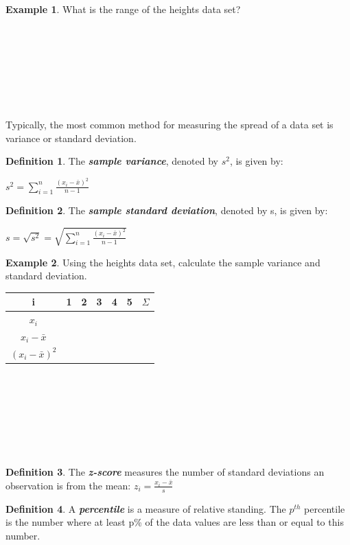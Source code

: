 \documentclass[
  11pt,
  oneside]{book}
\theoremstyle{definition}
\newtheorem{definition}{Definition}[chapter]
\theoremstyle{definition}
\newtheorem{example}{Example}[chapter]
\theoremstyle{definition}
\theoremstyle{definition}
\theoremstyle{remark}
\begin{document}
\begin{example}
What is the range of the heights data set?
\end{example}

\(~\)

\(~\)

\(~\)

\(~\)

\newpage

Typically, the most common method for measuring the spread of a data set is variance or standard deviation.

\begin{definition}
The \textbf{\emph{sample variance}}, denoted by \(s^2\), is given by:

\(s^2 = \sum_{i=1}^n\frac{(x_i - \bar{x})^2}{n-1}\)
\end{definition}

\begin{definition}
The \textbf{\emph{sample standard deviation}}, denoted by s, is given by:

\(s = \sqrt{s^2} = \sqrt{\sum_{i=1}^n\frac{(x_i - \bar{x})^2}{n-1}}\)
\end{definition}

\begin{example}
Using the heights data set, calculate the sample variance and standard deviation.
\end{example}

\begin{table}[!h]
\centering
\begin{tabular}{c|c|c|c|c|c|c}
\hline
i & 1 & 2 & 3 & 4 & 5 & $\Sigma$\\
\hline
$x_i$ &  &  &  &  &  & \\
\hline
$x_i - \bar{x}$ &  &  &  &  &  & \\
\hline
$(x_i - \bar{x})^2$ &  &  &  &  &  & \\
\hline
\end{tabular}
\end{table}

\(~\)

\(~\)

\(~\)

\(~\)

\begin{definition}
The \textbf{\emph{z-score}} measures the number of standard deviations an observation is from the mean: \(z_i = \frac{x_i-\bar{x}}{s}\)
\end{definition}

\begin{definition}
A \textbf{\emph{percentile}} is a measure of relative standing. The \(p^{th}\) percentile is the number where at least p\% of the data values are less than or equal to this number.
\end{definition}
\end{document}
